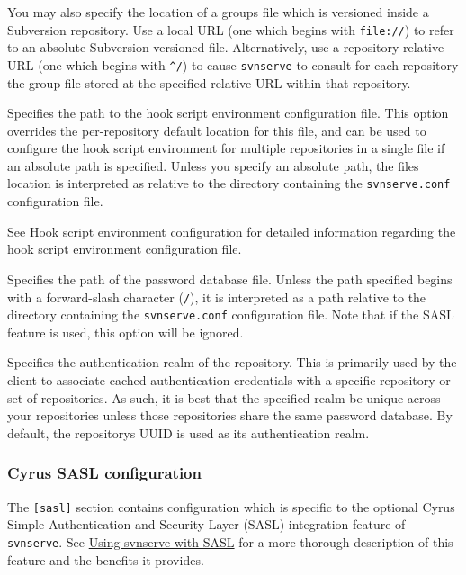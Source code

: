 \begin{description}
You may also specify the location of a groups file which is versioned
inside a Subversion repository. Use a local URL (one which begins with
\texttt{file://}) to refer to an absolute Subversion-versioned file.
Alternatively, use a repository relative URL (one which begins with
\texttt{\^{}/}) to cause \texttt{svnserve} to consult for each
repository the group file stored at the specified relative URL within
that repository.
\item[\texttt{hooks-env}]
Specifies the path to the hook script environment configuration file.
This option overrides the per-repository default location for this file,
and can be used to configure the hook script environment for multiple
repositories in a single file if an absolute path is specified. Unless
you specify an absolute path, the file\textquotesingle s location is
interpreted as relative to the directory containing the
\texttt{svnserve.conf} configuration file.

See \hyperref[svn.reposadmin.hooks.configuration]{Hook script
environment configuration} for detailed information regarding the hook
script environment configuration file.
\item[\texttt{password-db}]
Specifies the path of the password database file. Unless the path
specified begins with a forward-slash character (\texttt{/}), it is
interpreted as a path relative to the directory containing the
\texttt{svnserve.conf} configuration file. Note that if the SASL feature
is used, this option will be ignored.
\item[\texttt{realm}]
Specifies the authentication realm of the repository. This is primarily
used by the client to associate cached authentication credentials with a
specific repository or set of repositories. As such, it is best that the
specified realm be unique across your repositories unless those
repositories share the same password database. By default, the
repository\textquotesingle s UUID is used as its authentication realm.
\end{description}

\subsubsection{Cyrus SASL
configuration}\label{svn.serverconfig.svnserve.ref.sasl}

The \texttt{{[}sasl{]}} section contains configuration which is specific
to the optional Cyrus Simple Authentication and Security Layer (SASL)
integration feature of \texttt{svnserve}. See
\hyperref[svn.serverconfig.svnserve.sasl]{Using svnserve with SASL} for
a more thorough description of this feature and the benefits it
provides.

